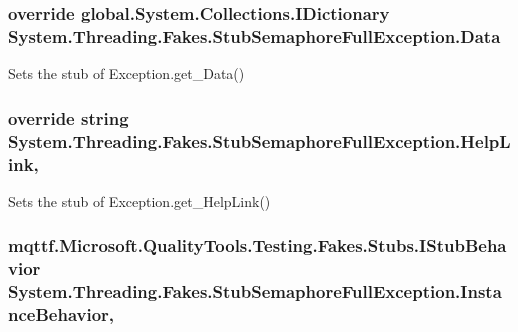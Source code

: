 \hypertarget{class_system_1_1_threading_1_1_fakes_1_1_stub_semaphore_full_exception_ab9d16690347f069aee25f96933fa2536}{
\subsubsection[{Data}]{\setlength{\rightskip}{0pt plus 5cm}override global.\-System.\-Collections.\-I\-Dictionary System.\-Threading.\-Fakes.\-Stub\-Semaphore\-Full\-Exception.\-Data\hspace{0.3cm}{\ttfamily [get]}}}\label{class_system_1_1_threading_1_1_fakes_1_1_stub_semaphore_full_exception_ab9d16690347f069aee25f96933fa2536}


Sets the stub of Exception.\-get\-\_\-\-Data()

\hypertarget{class_system_1_1_threading_1_1_fakes_1_1_stub_semaphore_full_exception_a82c520c74e28757fba467d08f887a8bf}{
\subsubsection[{Help\-Link}]{\setlength{\rightskip}{0pt plus 5cm}override string System.\-Threading.\-Fakes.\-Stub\-Semaphore\-Full\-Exception.\-Help\-Link\hspace{0.3cm}{\ttfamily [get]}, {\ttfamily [set]}}}\label{class_system_1_1_threading_1_1_fakes_1_1_stub_semaphore_full_exception_a82c520c74e28757fba467d08f887a8bf}


Sets the stub of Exception.\-get\-\_\-\-Help\-Link()

\hypertarget{class_system_1_1_threading_1_1_fakes_1_1_stub_semaphore_full_exception_a8152ae90a1ef0655ce7f8885ec113793}{
\subsubsection[{Instance\-Behavior}]{\setlength{\rightskip}{0pt plus 5cm}mqttf.\-Microsoft.\-Quality\-Tools.\-Testing.\-Fakes.\-Stubs.\-I\-Stub\-Behavior System.\-Threading.\-Fakes.\-Stub\-Semaphore\-Full\-Exception.\-Instance\-Behavior\hspace{0.3cm}{\ttfamily [get]}, {\ttfamily [set]}}}\label{class_system_1_1_threading_1_1_fakes_1_1_stub_semaphore_full_exception_a8152ae90a1ef0655ce7f8885ec113793}


